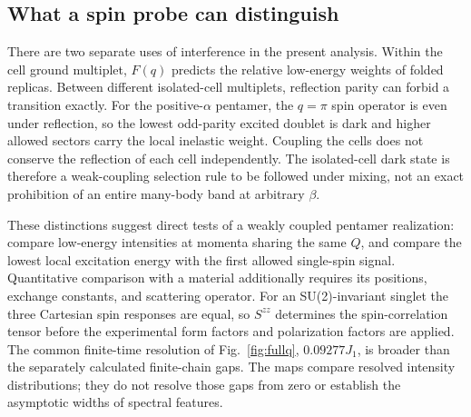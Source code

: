 \subsection{What a spin probe can distinguish}

There are two separate uses of interference in the present analysis.
Within the cell ground multiplet, $F(q)$ predicts the relative low-energy
weights of folded replicas. Between different isolated-cell multiplets,
reflection parity can forbid a transition exactly.
For the positive-$\alpha$ pentamer, the $q=\pi$ spin operator is even under
reflection, so the lowest odd-parity excited doublet is dark and higher
allowed sectors carry the local inelastic weight.
Coupling the cells does not conserve the reflection of each cell
independently. The isolated-cell dark state is therefore a weak-coupling
selection rule to be followed under mixing, not an exact prohibition of an
entire many-body band at arbitrary $\beta$.

These distinctions suggest direct tests of a weakly coupled pentamer
realization: compare low-energy intensities at momenta sharing the same
$Q$, and compare the lowest local excitation energy with the first allowed
single-spin signal. Quantitative comparison with a material additionally
requires its positions, exchange constants, and scattering operator.
For an SU(2)-invariant singlet the three Cartesian spin responses are equal,
so $S^{zz}$ determines the spin-correlation tensor before the experimental
form factors and polarization factors are applied.
The common finite-time resolution of Fig.~\ref{fig:fullq},
$0.09277J_1$, is broader than the separately calculated finite-chain gaps.
The maps compare resolved intensity distributions; they do not resolve
those gaps from zero or establish the asymptotic widths of spectral features.
